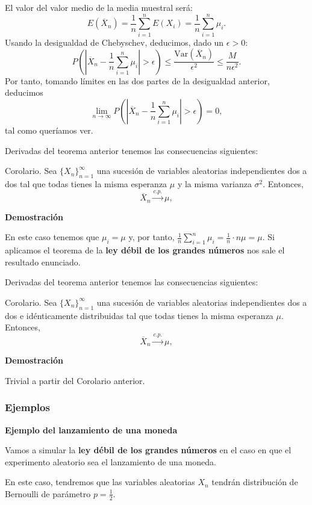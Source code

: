 \documentclass[]{book}
\begin{document}
El valor del valor medio de la media muestral será:
\[
E(\overline{X}_n)=\frac{1}{n}\sum_{i=1}^n E(X_i)=\frac{1}{n}\sum_{i=1}^n \mu_i. 
\]
Usando la desigualdad de Chebyschev, deducimos, dado un \(\epsilon >0\):
\[
P\left(\left|\overline{X}_n-\frac{1}{n}\sum_{i=1}^n \mu_i\right|>\epsilon\right) \leq \frac{\mathrm{Var}(\overline{X}_n)}{\epsilon^2}\leq \frac{M}{n\epsilon^2}.
\]
Por tanto, tomando límites en las dos partes de la desigualdad anterior, deducimos
\[
\lim_{n\to \infty}P\left(\left|\overline{X}_n-\frac{1}{n}\sum_{i=1}^n \mu_i\right|>\epsilon\right) =0,
\]
tal como queríamos ver.

Derivadas del teorema anterior tenemos las consecuencias siguientes:

Corolario.
Sea \(\{X_n\}_{n=1}^\infty\) una sucesión de variables aleatorias independientes dos a dos tal que todas tienes la misma esperanza \(\mu\) y la misma varianza \(\sigma^2\). Entonces,
\[
\overline{X}_n\stackrel{c.p.}{\longrightarrow} \mu,
\]

\textbf{Demostración}

En este caso tenemos que \(\mu_i=\mu\) y, por tanto, \(\frac{1}{n}\sum\limits_{i=1}^n \mu_i =\frac{1}{n}\cdot n\mu=\mu\). Si aplicamos el teorema de la \textbf{ley débil de los grandes números} nos sale el resultado enunciado.

Derivadas del teorema anterior tenemos las consecuencias siguientes:

Corolario.
Sea \(\{X_n\}_{n=1}^\infty\) una sucesión de variables aleatorias independientes dos a dos e idénticamente distribuidas tal que todas tienes la misma esperanza \(\mu\). Entonces,
\[
\overline{X}_n\stackrel{c.p.}{\longrightarrow} \mu,
\]

\textbf{Demostración}

Trivial a partir del Corolario anterior.

\hypertarget{ejemplos-23}{%
\subsubsection{Ejemplos}\label{ejemplos-23}}

\textbf{Ejemplo del lanzamiento de una moneda}

Vamos a simular la \textbf{ley débil de los grandes números} en el caso en que el experimento aleatorio sea el lanzamiento de una moneda.

En este caso, tendremos que las variables aleatorias \(X_n\) tendrán distribución de Bernoulli de parámetro \(p=\frac{1}{2}\).
\end{document}
